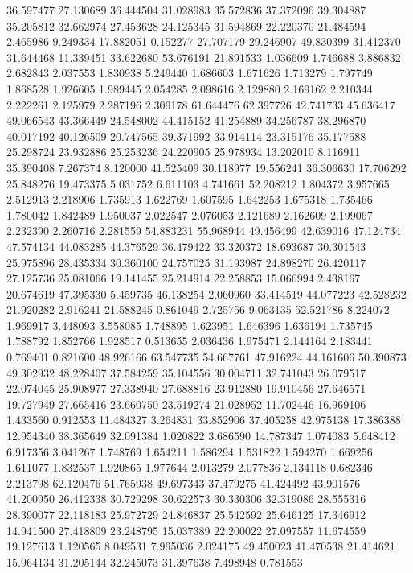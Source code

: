 36.597477
27.130689
36.444504
31.028983
35.572836
37.372096
39.304887
35.205812
32.662974
27.453628
24.125345
31.594869
22.220370
21.484594
2.465986
9.249334
17.882051
0.152277
27.707179
29.246907
49.830399
31.412370
31.644468
11.339451
33.622680
53.676191
21.891533
1.036609
1.746688
3.886832
2.682843
2.037553
1.830938
5.249440
1.686603
1.671626
1.713279
1.797749
1.868528
1.926605
1.989445
2.054285
2.098616
2.129880
2.169162
2.210344
2.222261
2.125979
2.287196
2.309178
61.644476
62.397726
42.741733
45.636417
49.066543
43.366449
24.548002
44.415152
41.254889
34.256787
38.296870
40.017192
40.126509
20.747565
39.371992
33.914114
23.315176
35.177588
25.298724
23.932886
25.253236
24.220905
25.978934
13.202010
8.116911
35.390408
7.267374
8.120000
41.525409
30.118977
19.556241
36.306630
17.706292
25.848276
19.473375
5.031752
6.611103
4.741661
52.208212
1.804372
3.957665
2.512913
2.218906
1.735913
1.622769
1.607595
1.642253
1.675318
1.735466
1.780042
1.842489
1.950037
2.022547
2.076053
2.121689
2.162609
2.199067
2.232390
2.260716
2.281559
54.883231
55.968944
49.456499
42.639016
47.124734
47.574134
44.083285
44.376529
36.479422
33.320372
18.693687
30.301543
25.975896
28.435334
30.360100
24.757025
31.193987
24.898270
26.420117
27.125736
25.081066
19.141455
25.214914
22.258853
15.066994
2.438167
20.674619
47.395330
5.459735
46.138254
2.060960
33.414519
44.077223
42.528232
21.920282
2.916241
21.588245
0.861049
2.725756
9.063135
52.521786
8.224072
1.969917
3.448093
3.558085
1.748895
1.623951
1.646396
1.636194
1.735745
1.788792
1.852766
1.928517
0.513655
2.036436
1.975471
2.144164
2.183441
0.769401
0.821600
48.926166
63.547735
54.667761
47.916224
44.161606
50.390873
49.302932
48.228407
37.584259
35.104556
30.004711
32.741043
26.079517
22.074045
25.908977
27.338940
27.688816
23.912880
19.910456
27.646571
19.727949
27.665416
23.660750
23.519274
21.028952
11.702446
16.969106
1.433560
0.912553
11.484327
3.264831
33.852906
37.405258
42.975138
17.386388
12.954340
38.365649
32.091384
1.020822
3.686590
14.787347
1.074083
5.648412
6.917356
3.041267
1.748769
1.654211
1.586294
1.531822
1.594270
1.669256
1.611077
1.832537
1.920865
1.977644
2.013279
2.077836
2.134118
0.682346
2.213798
62.120476
51.765938
49.697343
37.479275
41.424492
43.901576
41.200950
26.412338
30.729298
30.622573
30.330306
32.319086
28.555316
28.390077
22.118183
25.972729
24.846837
25.542592
25.646125
17.346912
14.941500
27.418809
23.248795
15.037389
22.200022
27.097557
11.674559
19.127613
1.120565
8.049531
7.995036
2.024175
49.450023
41.470538
21.414621
15.964134
31.205144
32.245073
31.397638
7.498948
0.781553
